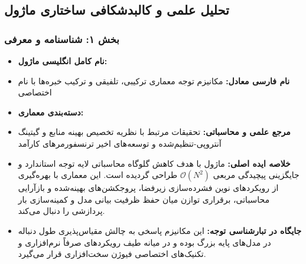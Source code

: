 \subsection{تحلیل علمی و کالبدشکافی ساختاری ماژول }
\label{sec:rpc}

\subsubsection*{بخش ۱: شناسنامه و معرفی }
\begin{itemize}
    \item \textbf{نام کامل انگلیسی ماژول:} 
    \item \textbf{نام فارسی معادل:} مکانیزم توجه معماری ترکیبی، تلفیقی و ترکیب خبره‌ها  با نام اختصاصی 
    \item \textbf{دسته‌بندی معماری:} 
    \item \textbf{مرجع علمی و محاسباتی:} تحقیقات مرتبط با نظریه تخصیص بهینه منابع و گیتینگ آنتروپی-تنظیم‌شده و توسعه‌های اخیر ترنسفورمرهای کارآمد
    \item \textbf{خلاصه ایده اصلی:} ماژول  با هدف کاهش گلوگاه محاسباتی لایه توجه استاندارد و جایگزینی پیچیدگی مربعی $\mathcal{O}(N^2)$ طراحی گردیده است. این معماری با بهره‌گیری از رویکردهای نوین فشرده‌سازی زیرفضا، پروجکشن‌های بهینه‌شده و بازآرایی محاسباتی، برقراری توازن میان حفظ ظرفیت بیانی مدل و کمینه‌سازی بار پردازشی را دنبال می‌کند.
    \item \textbf{جایگاه در تبارشناسی توجه:} این مکانیزم پاسخی به چالش مقیاس‌پذیری طول دنباله در مدل‌های پایه بزرگ بوده و در میانه طیف رویکردهای صرفاً نرم‌افزاری و تکنیک‌های اختصاصی فیوژن سخت‌افزاری قرار می‌گیرد.
\end{itemize}

